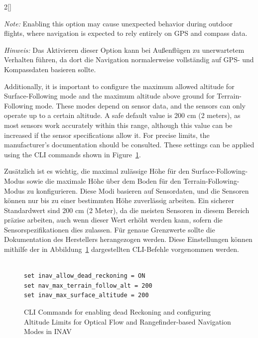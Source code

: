 \begin{paracol}{2}[]
\coleng

\textsl{Note:} Enabling this option may cause unexpected behavior during outdoor flights, where navigation is expected to rely entirely on GPS and compass data.

\colger

\textsl{Hinweis:} Das Aktivieren dieser Option kann bei Außenflügen zu unerwartetem Verhalten führen, da dort die Navigation normalerweise vollständig auf GPS- und Kompassdaten basieren sollte.

\coleng

Additionally, it is important to configure the maximum allowed altitude for Surface-Following mode and the maximum altitude above ground for Terrain-Following mode. These modes depend on sensor data, and the sensors can only operate up to a certain altitude. A safe default value is 200 cm (2 meters), as most sensors work accurately within this range, although this value can be increased if the sensor specifications allow it. For precise limits, the manufacturer’s documentation should be consulted. These settings can be applied using the CLI commands shown in Figure~\ref{INAVCliCommandsToEnableOFAndLider}.

\colger

Zusätzlich ist es wichtig, die maximal zulässige Höhe für den Surface-Following-Modus sowie die maximale Höhe über dem Boden für den Terrain-Following-Modus zu konfigurieren. Diese Modi basieren auf Sensordaten, und die Sensoren können nur bis zu einer bestimmten Höhe zuverlässig arbeiten. Ein sicherer Standardwert sind 200 cm (2 Meter), da die meisten Sensoren in diesem Bereich präzise arbeiten, auch wenn dieser Wert erhöht werden kann, sofern die Sensorspezifikationen dies zulassen. Für genaue Grenzwerte sollte die Dokumentation des Herstellers herangezogen werden. Diese Einstellungen können mithilfe der in Abbildung~\ref{INAVCliCommandsToEnableOFAndLider} dargestellten CLI-Befehle vorgenommen werden.

\colende

\begin{figure}
\begin{lstlisting}[style=shell]

set inav_allow_dead_reckoning = ON 
set nav_max_terrain_follow_alt = 200
set inav_max_surface_altitude = 200

\end{lstlisting}
\caption{CLI Commands for enabling dead Reckoning and configuring Altitude Limits for Optical Flow and Rangefinder-based Navigation Modes in INAV}
\label{INAVCliCommandsToEnableOFAndLider}
\end{figure}
\FloatBarrier


\end{paracol}
